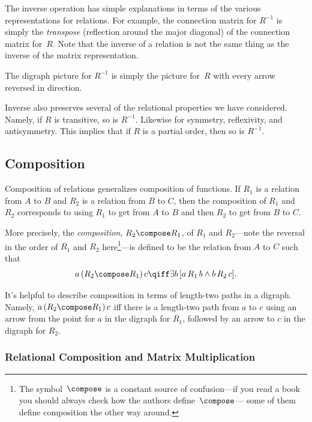 The inverse operation has simple explanations in terms of the various
representations for relations.  For example, the connection matrix for
$R^{-1}$ is simply the \emph{transpose} (reflection around the major
diagonal) of the connection matrix for~$R$.  Note that the inverse of a
relation is not the same thing as the inverse of the matrix
representation.

The digraph picture for $R^{-1}$ is simply the picture for~$R$ with every
arrow reversed in direction.

Inverse also preserves several of the relational properties we have
considered.  Namely, if $R$ is transitive, so is $R^{-1}$.  Likewise for
symmetry, reflexivity, and antisymmetry.  This implies that if $R$ is a
partial order, then so is $R^{-1}$.


\subsection{Composition}

Composition of relations generalizes composition of functions.  If
$R_1$ is a relation from $A$ to $B$ and $R_2$ is a relation from $B$ to
$C$, then the composition of $R_1$ and $R_2$ corresponds to using $R_1$ to
get from $A$ to $B$ and then $R_2$ to get from $B$ to $C$.

More precisely, the \emph{composition}, $R_2 \compose R_1$, of $R_1$ and
$R_2$---note the reversal in the order of $R_1$ and $R_2$
here\footnote{The symbol~$\compose$ is a constant source of confusion---if
you read a book you should always check how the authors define~$\compose$---
some of them define composition the other way around.}---is defined to be
the relation from $A$ to $C$ such that
\begin{displaymath}
a\, (R_2 \compose R_1)\, c  \qiff \exists b\, [a\, R_1\, b \land b\, R_2\, c].
\end{displaymath}

It's helpful to describe composition in terms of length-two paths in a
digraph.  Namely, $a\, (R_2 \compose R_1)\, c$ iff there is a length-two path
from $a$ to $c$ using an arrow from the point for $a$ in the digraph for
$R_1$, followed by an arrow to $c$ in the digraph for $R_2$.


\subsubsection{Relational Composition and Matrix Multiplication}

